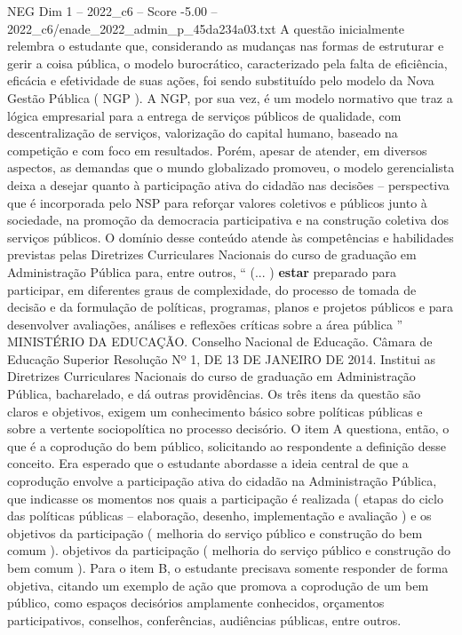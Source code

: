 \begin{textsample}{NEG Dim 1 – 2022\_c6 – Score -5.00 – 2022\_c6/enade\_2022\_admin\_p\_45da234a03.txt}
A questão inicialmente relembra o estudante que, considerando as mudanças nas formas de estruturar e gerir a coisa pública, o modelo burocrático, caracterizado pela falta de eficiência, eficácia e efetividade de suas ações, foi sendo substituído pelo modelo da Nova Gestão Pública ( NGP ).
A NGP, por sua vez, é um modelo normativo que traz a lógica empresarial para a entrega de serviços públicos de qualidade, com descentralização de serviços, valorização do capital humano, baseado na competição e com foco em resultados.
Porém, apesar de atender, em diversos aspectos, as demandas que o mundo globalizado promoveu, o modelo gerencialista deixa a desejar quanto à participação ativa do cidadão nas decisões – perspectiva que é incorporada pelo NSP para reforçar valores coletivos e públicos junto à sociedade, na promoção da democracia participativa e na construção coletiva dos serviços públicos.
O domínio desse conteúdo atende às competências e habilidades previstas pelas Diretrizes Curriculares Nacionais do curso de graduação em Administração Pública para, entre outros, “ (... ) \textbf{estar} preparado para participar, em diferentes graus de complexidade, do processo de tomada de decisão e da formulação de políticas, programas, planos e projetos públicos e para desenvolver avaliações, análises e reflexões críticas sobre a área pública ” MINISTÉRIO DA EDUCAÇÃO.
Conselho Nacional de Educação.
Câmara de Educação Superior Resolução Nº 1, DE 13 DE JANEIRO DE 2014.
Institui as Diretrizes Curriculares Nacionais do curso de graduação em Administração Pública, bacharelado, e dá outras providências.
Os três itens da questão são claros e objetivos, exigem um conhecimento básico sobre políticas públicas e sobre a vertente sociopolítica no processo decisório.
O item A questiona, então, o que é a coprodução do bem público, solicitando ao respondente a definição desse conceito.
Era esperado que o estudante abordasse a ideia central de que a coprodução envolve a participação ativa do cidadão na Administração Pública, que indicasse os momentos nos quais a participação é realizada ( etapas do ciclo das políticas públicas – elaboração, desenho, implementação e avaliação ) e os objetivos da participação ( melhoria do serviço público e construção do bem comum ). objetivos da participação ( melhoria do serviço público e construção do bem comum ).
Para o item B, o estudante precisava somente responder de forma objetiva, citando um exemplo de ação que promova a coprodução de um bem público, como espaços decisórios amplamente conhecidos, orçamentos participativos, conselhos, conferências, audiências públicas, entre outros.

\end{textsample}
